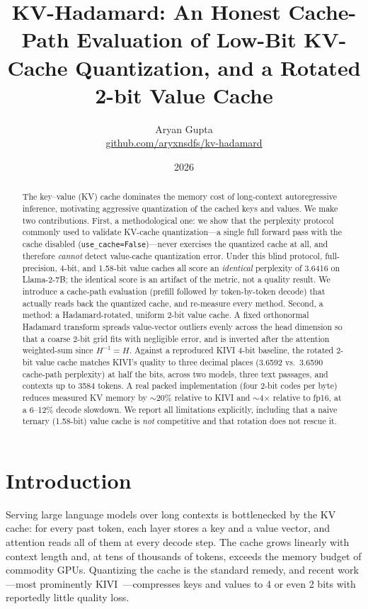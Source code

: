 \documentclass[11pt]{article}
\title{\textbf{KV-Hadamard: An Honest Cache-Path Evaluation of Low-Bit
KV-Cache Quantization, and a Rotated 2-bit Value Cache}}
\author{Aryan Gupta\\
\small \href{https://github.com/aryxnsdfs/kv-hadamard}{github.com/aryxnsdfs/kv-hadamard}}
\date{2026}
\begin{document}
\maketitle

\begin{abstract}
The key--value (KV) cache dominates the memory cost of long-context
autoregressive inference, motivating aggressive quantization of the cached
keys and values. We make two contributions. First, a methodological one: we
show that the perplexity protocol commonly used to validate KV-cache
quantization---a single full forward pass with the cache disabled
(\texttt{use\_cache=False})---never exercises the quantized cache at all, and
therefore \emph{cannot} detect value-cache quantization error. Under this
blind protocol, full-precision, 4-bit, and 1.58-bit value caches all score an
\emph{identical} perplexity of 3.6416 on Llama-2-7B; the identical score is an
artifact of the metric, not a quality result. We introduce a cache-path
evaluation (prefill followed by token-by-token decode) that actually reads
back the quantized cache, and re-measure every method. Second, a method: a
Hadamard-rotated, uniform 2-bit value cache. A fixed orthonormal Hadamard
transform spreads value-vector outliers evenly across the head dimension so
that a coarse 2-bit grid fits with negligible error, and is inverted after the
attention weighted-sum since $H^{-1}=H$. Against a reproduced KIVI 4-bit
baseline, the rotated 2-bit value cache matches KIVI's quality to three decimal
places (3.6592 vs.\ 3.6590 cache-path perplexity) at half the bits, across two
models, three text passages, and contexts up to 3584 tokens. A real packed
implementation (four 2-bit codes per byte) reduces measured KV memory by
$\sim$20\% relative to KIVI and $\sim$4$\times$ relative to fp16, at a
6--12\% decode slowdown. We report all limitations explicitly, including that a
naive ternary (1.58-bit) value cache is \emph{not} competitive and that
rotation does not rescue it.
\end{abstract}

\section{Introduction}
Serving large language models over long contexts is bottlenecked by the KV
cache: for every past token, each layer stores a key and a value vector, and
attention reads all of them at every decode step. The cache grows linearly with
context length and, at tens of thousands of tokens, exceeds the memory budget
of commodity GPUs. Quantizing the cache is the standard remedy, and recent
work---most prominently KIVI~\cite{kivi}---compresses keys and values to 4 or
even 2 bits with reportedly little quality loss.
\end{document}
